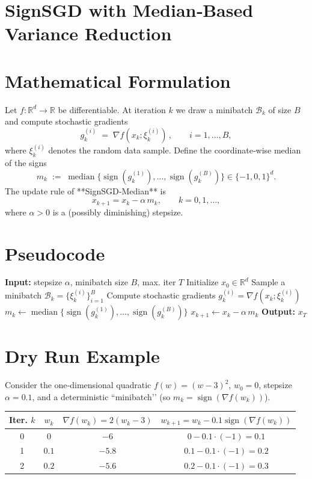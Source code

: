 \documentclass{article}
\newcommand{\sign}{\operatorname{sign}}
\newcommand{\R}{\mathbb{R}}
\begin{document}
\section*{SignSGD with Median‑Based Variance Reduction}

\section*{Mathematical Formulation}
Let $f:\R^{d}\rightarrow\R$ be differentiable.  
At iteration $k$ we draw a minibatch $\mathcal{B}_{k}$ of size $B$ and compute stochastic gradients
\[
g_{k}^{(i)}\;=\;\nabla f(x_{k};\xi_{k}^{(i)})\,,\qquad i=1,\dots ,B,
\]
where $\xi_{k}^{(i)}$ denotes the random data sample.  
Define the coordinate‑wise median of the signs
\[
m_{k}\;:=\;\operatorname{median}\bigl\{\sign(g_{k}^{(1)}),\dots ,\sign(g_{k}^{(B)})\bigr\}\in\{-1,0,1\}^{d}.
\]
The update rule of **SignSGD‑Median** is
\[
\boxed{x_{k+1}=x_{k}-\alpha\, m_{k}},\qquad k=0,1,\dots ,
\]
where $\alpha>0$ is a (possibly diminishing) stepsize.

\section*{Pseudocode}
\begin{algorithm}[H]
\caption{SignSGD‑Median}
\begin{algorithmic}[1]
\State \textbf{Input:} stepsize $\alpha$, minibatch size $B$, max. iter $T$
\State Initialize $x_{0}\in\R^{d}$
    \State Sample a minibatch $\mathcal{B}_{k}=\{\xi_{k}^{(i)}\}_{i=1}^{B}$
    \State Compute stochastic gradients $g_{k}^{(i)}=\nabla f(x_{k};\xi_{k}^{(i)})$
    \State $m_{k}\gets\operatorname{median}\{\sign(g_{k}^{(1)}),\dots ,\sign(g_{k}^{(B)})\}$
    \State $x_{k+1}\gets x_{k}-\alpha\, m_{k}$
\EndFor
\State \textbf{Output:} $x_{T}$
\end{algorithmic}
\end{algorithm}

\section*{Dry Run Example}
Consider the one‑dimensional quadratic $f(w)=(w-3)^{2}$, $w_{0}=0$, stepsize $\alpha=0.1$, and a deterministic “minibatch’’ (so $m_{k}=\sign(\nabla f(w_{k}))$).

\begin{tabular}{c|c|c|c}
\textbf{Iter.} $k$ & $w_{k}$ & $\nabla f(w_{k})=2(w_{k}-3)$ & $w_{k+1}=w_{k}-0.1\sign(\nabla f(w_{k}))$ \\ \hline
0 & $0$ & $-6$ & $0-0.1\cdot(-1)=0.1$ \\
1 & $0.1$ & $-5.8$ & $0.1-0.1\cdot(-1)=0.2$ \\
2 & $0.2$ & $-5.6$ & $0.2-0.1\cdot(-1)=0.3$
\end{tabular}
\end{document}
